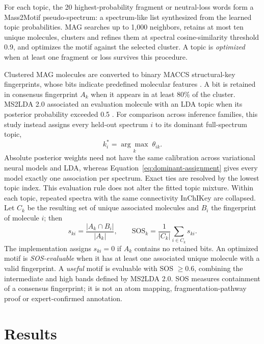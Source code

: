 \documentclass[10pt,a4paper]{article}
\begin{document}
For each topic, the 20 highest-probability fragment or neutral-loss words form a
Mass2Motif pseudo-spectrum: a spectrum-like list synthesized from the learned
topic probabilities. MAG searches up to 1,000 neighbors, retains at most ten
unique molecules, clusters and refines them at spectral cosine-similarity
threshold 0.9, and optimizes the motif against the selected cluster. A topic is
\emph{optimized} when at least one fragment or loss survives this procedure.

Clustered MAG molecules are converted to binary MACCS structural-key
fingerprints, whose bits indicate predefined molecular features
\cite{durant2002}. A bit is retained in consensus fingerprint $A_k$ when it
appears in at least 80\% of the cluster. MS2LDA 2.0 associated an evaluation
molecule with an LDA topic when its posterior probability exceeded 0.5
\cite{torresortega2026}. For comparison across inference families, this study
instead assigns every held-out spectrum $i$ to its dominant full-spectrum topic,
\begin{equation}
  k_i^*=\underset{k}{\arg\max}\;\theta_{ik}.
  \label{eq:dominant-assignment}
\end{equation}
Absolute posterior weights need not have the same calibration across variational
neural models and LDA, whereas Equation~\ref{eq:dominant-assignment} gives every
model exactly one association per spectrum. Exact ties are resolved by the
lowest topic index. This evaluation rule does not alter the fitted topic mixture.
Within each topic, repeated spectra with the same connectivity InChIKey are
collapsed. Let $C_k$ be the resulting set of unique associated molecules and
$B_i$ the fingerprint of molecule $i$; then
\begin{equation}
  s_{ki}=\frac{|A_k\cap B_i|}{|A_k|},\qquad
  \mathrm{SOS}_k=\frac1{|C_k|}\sum_{i\in C_k}s_{ki}.
  \label{eq:sos}
\end{equation}
The implementation assigns $s_{ki}=0$ if $A_k$ contains no retained bits.
An optimized motif is \emph{SOS-evaluable} when it has at least one associated
unique molecule with a valid fingerprint. A \emph{useful} motif is evaluable
with SOS $\geq0.6$, combining the intermediate and high bands defined by
MS2LDA 2.0. SOS measures containment of a consensus fingerprint; it is not an
atom mapping, fragmentation-pathway proof or expert-confirmed annotation.

\section{Results}
\end{document}
